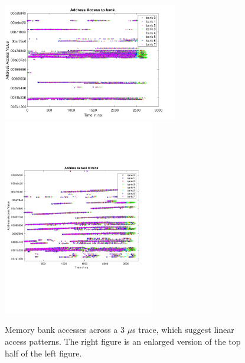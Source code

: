 

\begin{figure}[htb] \centering
\includegraphics[width=3in,height=0.2\textheight]{figures/prefetch1.pdf}
\includegraphics[width=2.6in,height=0.2\textheight]{figures/prefetch2.pdf}
\caption{Memory bank accesses across a 3 $\mu$s trace, which suggest linear access patterns. The right figure is an enlarged version of the top half of the left figure. }
\label{fig:prefetch1}
\end{figure}

